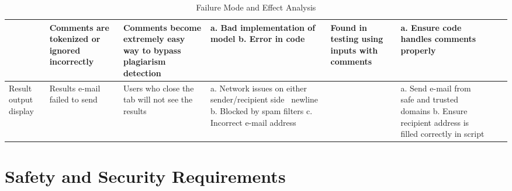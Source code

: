 \documentclass{article}
\begin{document}
\begin{landscape}
\begin{table}[ht]
{\begin{tabular}{|p{1.75cm}|p{4cm}|p{5cm}|p{5cm}|p{3cm}|p{5cm}|p{2cm}|p{2cm}|}
        \cline{2-8}
        & Comments are tokenized or ignored incorrectly & Comments become extremely easy way to bypass plagiarism detection & a. Bad implementation of model \newline b. Error in code & Found in testing using inputs with comments & a. Ensure code handles comments properly & &\\
        \hline
        Result output display & Results e-mail failed to send & Users who close the tab will not see the results & a. Network issues on either sender/recipient side \ newline b. Blocked by spam filters \newline c. Incorrect e-mail address & & a. Send e-mail from safe and trusted domains b. Ensure recipient address is filled correctly in script & & \\
        \hline
        \end{tabular}
        } %
        \caption{Failure Mode and Effect Analysis}
        \label{table:fmea}
    \end{table}
\end{landscape}
   

\section{Safety and Security Requirements}
\end{document}
